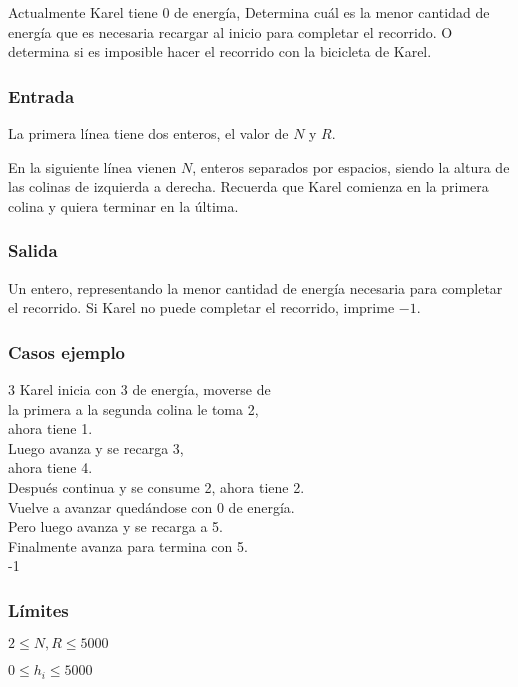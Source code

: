 Actualmente Karel tiene \(0\) de energía, Determina cuál es la menor cantidad de energía que es necesaria recargar al inicio para completar el recorrido. O determina si es imposible hacer el recorrido con la bicicleta de Karel.

\subsubsection*{Entrada}
La primera línea tiene dos enteros, el valor de \(N\) y \(R\).

En la siguiente línea vienen \(N\), enteros separados por espacios, siendo la altura de las colinas de izquierda a derecha. Recuerda que Karel comienza en la primera colina y quiera terminar en la última.
\subsubsection*{Salida}
Un entero, representando la menor cantidad de energía necesaria para completar el recorrido. Si Karel no puede completar el recorrido, imprime \(-1\).

\subsubsection*{Casos ejemplo}
\begin{casebox3}	
	{3}
	{
		Karel inicia con 3 de energía, moverse de   \\
		la primera a la segunda colina le toma 2,  \\
		ahora tiene 1.\\
		Luego avanza y se recarga 3,\\
		ahora tiene 4.\\
		Después continua y se consume 2, ahora tiene 2. \\
		Vuelve a avanzar quedándose con 0 de energía. \\		
		Pero luego avanza y se recarga a 5. \\
		Finalmente avanza para termina con 5. \\
	}
	{-1}
	{}
	\hline
\end{casebox3}	

\subsubsection*{Límites}
\begin{plimits}
	\item \(2\leq N, R \leq 5000\)
	\item \(0\leq h_i\leq 5000\)
\end{plimits}

